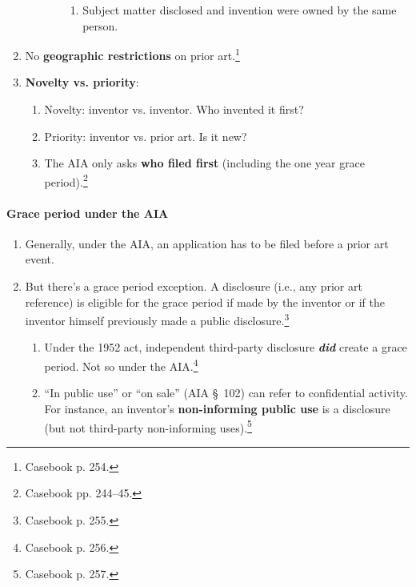 \begin{enumerate}
\begin{enumerate}
\begin{enumerate}
\begin{enumerate}
                \item Subject matter disclosed and invention were owned by the 
                same person.
            \end{enumerate}
        \end{enumerate}
    \end{enumerate}
    \item No \textbf{geographic restrictions} on prior 
    art.\footnote{Casebook p. 254.}
    \item \textbf{Novelty vs. priority}:
    \begin{enumerate}
        \item Novelty: inventor vs. inventor. Who invented it first?
        \item Priority: inventor vs. prior art. Is it new?
        \item The AIA only asks \textbf{who filed first} (including the one 
        year grace period).\footnote{Casebook pp. 244--45.}
    \end{enumerate}
\end{enumerate}

\paragraph{Grace period under the AIA}

\begin{enumerate}
    \item Generally, under the AIA, an application has to be filed before a 
    prior art event.
    \item But there's a grace period exception. A disclosure (i.e., any prior 
    art reference) is eligible for the grace period if made by the inventor or 
    if the inventor himself previously made a public 
    disclosure.\footnote{Casebook p. 255.}
    \begin{enumerate}
        \item Under the 1952 act, independent third-party disclosure 
        \emph{\textbf{did}} create a grace period. Not so under the 
        AIA.\footnote{Casebook p. 256.}
        \item ``In public use'' or ``on sale'' (AIA \S\ 102) can refer to 
        confidential activity. For instance, an inventor's \textbf{non-informing 
        public use} is a disclosure (but not third-party non-informing 
        uses).\footnote{Casebook p. 257.}
    \end{enumerate}
\end{enumerate}

